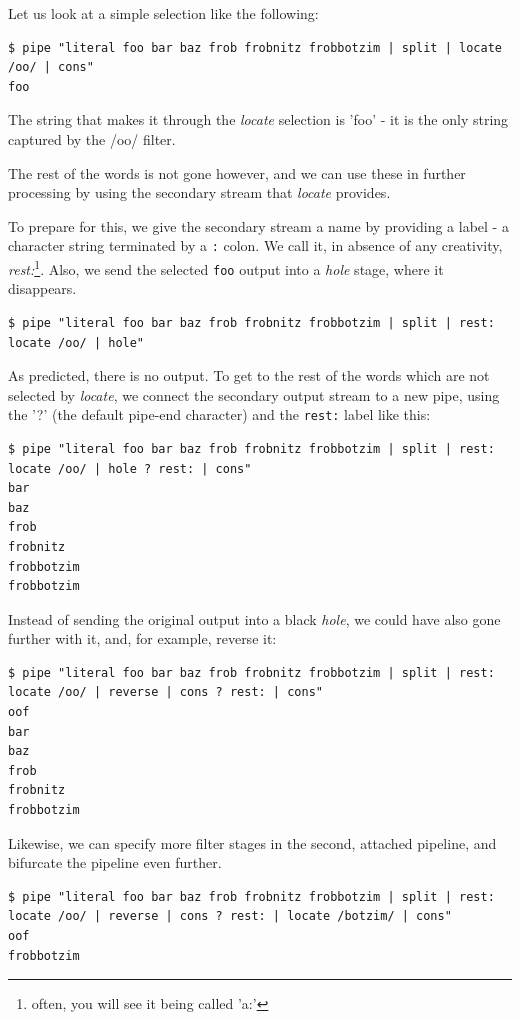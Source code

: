 Let us look at a simple selection like the following:

\begin{lstlisting}
$ pipe "literal foo bar baz frob frobnitz frobbotzim | split | locate /oo/ | cons"
foo
\end{lstlisting}
The string that makes it through the \emph{locate} selection is 'foo' -
it is the only string captured by the /oo/ filter.

The rest of the words is not gone however, and we can use these in
further processing by using the secondary stream that \emph{locate}
provides.

To prepare for this, we give the secondary stream a name by providing
a label - a character string terminated by a \texttt{:} colon. We call it, in absence of any creativity,
\emph{rest:}\footnote{often, you will see it being called 'a:'}. Also, we send the selected \texttt{foo} output into a
\emph{hole} stage, where it disappears.
\begin{lstlisting}
$ pipe "literal foo bar baz frob frobnitz frobbotzim | split | rest: locate /oo/ | hole"
\end{lstlisting}

As predicted, there is no output. To get to the rest of the words which are not selected
by \emph{locate}, we connect the secondary output stream to
a new pipe, using the '?' (the default pipe-end character) and the \texttt{rest:} label like this:
\begin{lstlisting}
$ pipe "literal foo bar baz frob frobnitz frobbotzim | split | rest: locate /oo/ | hole ? rest: | cons"
bar
baz
frob
frobnitz
frobbotzim
frobbotzim
\end{lstlisting}

Instead of sending the original output into a black \emph{hole}, we
could have also gone further with it, and, for example, reverse it:
\begin{lstlisting}
$ pipe "literal foo bar baz frob frobnitz frobbotzim | split | rest: locate /oo/ | reverse | cons ? rest: | cons"
oof
bar
baz
frob
frobnitz
frobbotzim
\end{lstlisting}
Likewise, we can specify more filter stages in the second, attached
pipeline, and bifurcate the pipeline even further.

\begin{lstlisting}
$ pipe "literal foo bar baz frob frobnitz frobbotzim | split | rest: locate /oo/ | reverse | cons ? rest: | locate /botzim/ | cons"
oof
frobbotzim
\end{lstlisting}


